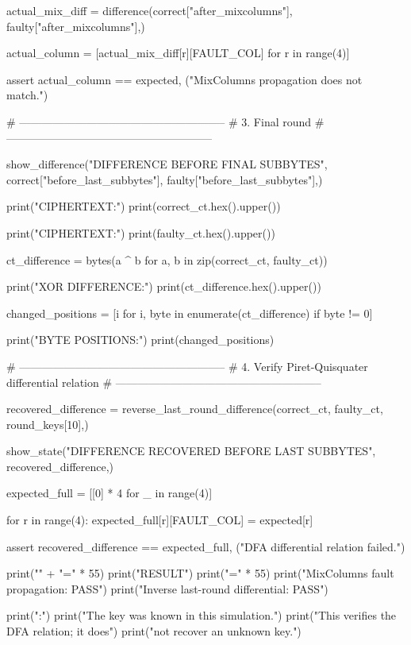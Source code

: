 \begin{lightcode}[numbers=left,firstnumber=1]
    actual_mix_diff = difference(correct["after_mixcolumns"], faulty["after_mixcolumns"],)

    actual_column = [actual_mix_diff[r][FAULT_COL] for r in range(4)]

    assert actual_column == expected, ("MixColumns propagation does not match.")

    # --------------------------------------------------------
    # 3. Final round
    # --------------------------------------------------------

    show_difference("DIFFERENCE BEFORE FINAL SUBBYTES", correct["before_last_subbytes"], faulty["before_last_subbytes"],)

    print("\nCORRECT CIPHERTEXT:")
    print(correct_ct.hex().upper())

    print("\nFAULTY CIPHERTEXT:")
    print(faulty_ct.hex().upper())

    ct_difference = bytes(a ^ b for a, b in zip(correct_ct, faulty_ct))

    print("\nCIPHERTEXT XOR DIFFERENCE:")
    print(ct_difference.hex().upper())

    changed_positions = [i for i, byte in enumerate(ct_difference) if byte != 0]

    print("\nCHANGED BYTE POSITIONS:")
    print(changed_positions)

    # --------------------------------------------------------
    # 4. Verify Piret-Quisquater differential relation
    # --------------------------------------------------------

    recovered_difference = reverse_last_round_difference(correct_ct, faulty_ct, round_keys[10],)

    show_state("DIFFERENCE RECOVERED BEFORE LAST SUBBYTES", recovered_difference,)

    expected_full = [[0] * 4 for _ in range(4)]

    for r in range(4):
        expected_full[r][FAULT_COL] = expected[r]

    assert recovered_difference == expected_full, ("DFA differential relation failed.")

    print("\n" + "=" * 55)
    print("RESULT")
    print("=" * 55)
    print("MixColumns fault propagation: PASS")
    print("Inverse last-round differential: PASS")

    print("\nNOTE:")
    print("The key was known in this simulation.")
    print("This verifies the DFA relation; it does")
    print("not recover an unknown key.")



\end{lightcode}
